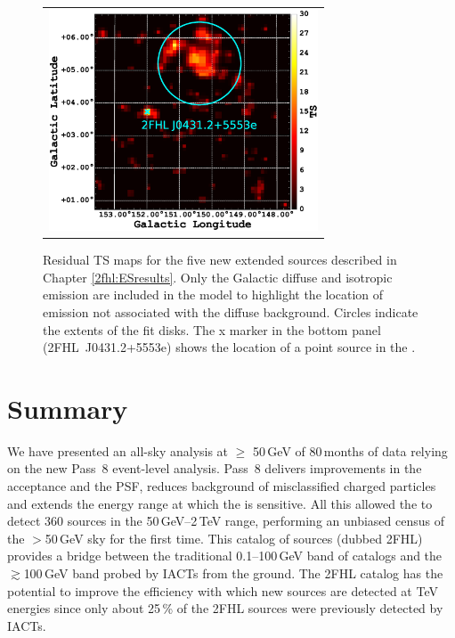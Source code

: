 \begin{figure}[ht]
\begin{center}
\begin{tabular}{ll}
            \multicolumn{2}{c}{\includegraphics[width=8cm]{Figures/l145_b0_ES_1_residTSmap_2FHL_zoom.eps} }\\
        \end{tabular}
    \end{center}
    \caption[Residual TS maps for the five new extended 2FHL sources.]{
        \label{fig:6ES} Residual TS maps for the five new extended sources described in Chapter \ref{2fhl:ESresults}.  Only the Galactic diffuse and isotropic emission are included in the model to highlight the location of emission not associated with the diffuse background. Circles indicate the extents of the fit disks. {The x marker in the bottom panel (2FHL~J0431.2+5553e) shows the location of a point source in the \roi{}.}}
\end{figure}






%
%
\section{Summary}
\label{sec:summary}

We have presented an all-sky analysis at $\geq$ 50\,GeV
of 80\,months of \lat{} data relying on the new Pass~8 event-level analysis.
Pass~8 delivers improvements in the acceptance and the PSF, reduces
background of misclassified charged particles
and extends the energy range at which the \lat{} is sensitive.
All this allowed the \lat{} to detect 360 sources in the 50\,GeV--2\,TeV range,
performing an unbiased census of the $>$50\,GeV sky for the first time.
This catalog of sources (dubbed 2FHL) provides a bridge between
the traditional 0.1--100\,GeV band of \lat{} catalogs \citep{3FGL}
and the $\gtrsim$100\,GeV band probed by IACTs from the ground.
The 2FHL catalog has the potential to improve the efficiency with
which new sources are detected at TeV energies since only
about 25\,\% of the 2FHL sources were previously detected by IACTs.

